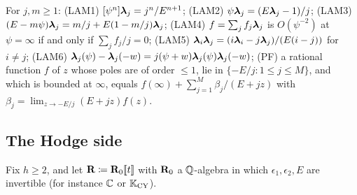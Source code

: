 \begin{lem}
\label{lem:set-leafid}
For $j,m\geq1$:
\textup{(LAM1)} $[\psi^n]\boldsymbol{\lambda}_j=j^n/E^{n+1}$;
\textup{(LAM2)} $\psi\boldsymbol{\lambda}_j=(E\boldsymbol{\lambda}_j-1)/j$;
\textup{(LAM3)} $(E-m\psi)\boldsymbol{\lambda}_j=m/j+E(1-m/j)\boldsymbol{\lambda}_j$;
\textup{(LAM4)} $f=\sum_{j}f_j\boldsymbol{\lambda}_j$ is $O(\psi^{-2})$ at $\psi=\infty$ if and only if $\sum_jf_j/j=0$;
\textup{(LAM5)} $\boldsymbol{\lambda}_i\boldsymbol{\lambda}_j=(i\boldsymbol{\lambda}_i-j\boldsymbol{\lambda}_j)/(E(i-j))$ for $i\neq j$;
\textup{(LAM6)} $\boldsymbol{\lambda}_j(\psi)-\boldsymbol{\lambda}_j(-w)=j(\psi+w)\boldsymbol{\lambda}_j(\psi)\boldsymbol{\lambda}_j(-w)$;
\textup{(PF)} a rational function $f$ of $z$ whose poles are of order $\leq1$, lie in $\{-E/j:1\leq j\leq M\}$, and which is bounded at $\infty$, equals $f(\infty)+\sum_{j=1}^{M}\beta_j/(E+jz)$ with $\beta_j=\lim_{z\to-E/j}(E+jz)f(z)$.
\end{lem}

\subsection{The Hodge side}
\label{sec:set-hodge}

Fix $h\geq2$, and let $\mathbf{R}\coloneqq\mathbf{R}_0[\![ t ]\!]$ with $\mathbf{R}_0$ a $\mathbb{Q}$-algebra in which $\epsilon_1,\epsilon_2,E$ are invertible (for instance $\mathbb{C}$ or $\mathbb{K}_{\mathrm{CY}}$).

